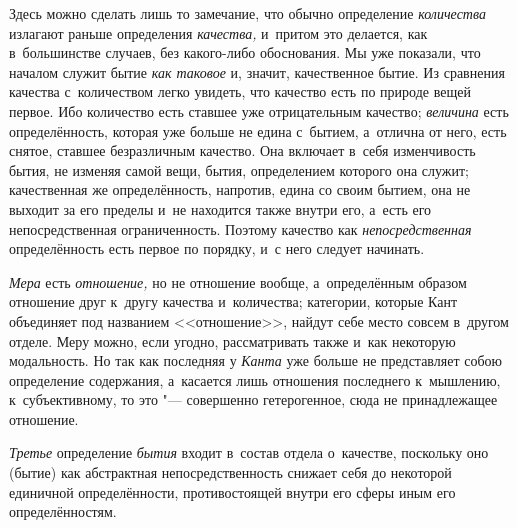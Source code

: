 Здесь можно сделать лишь то замечание, что обычно определение {\em количества}
излагают раньше определения {\em качества,} и~притом это делается, как
в~большинстве случаев, без какого-либо обоснования. Мы уже показали, что
началом служит бытие {\em как таковое} и, значит, качественное бытие. Из
сравнения качества с~количеством легко увидеть, что качество есть по природе
вещей первое. Ибо количество есть ставшее уже отрицательным качество;
{\em величина} есть определённость, которая уже больше не едина с~бытием,
а~отлична от него, есть снятое, ставшее безразличным качество. Она включает
в~себя изменчивость бытия, не изменяя самой вещи, бытия, определением которого
она служит; качественная же определённость, напротив, едина со своим бытием,
она не выходит за его пределы и~не находится также внутри его, а~есть его
непосредственная ограниченность. Поэтому качество как {\em непосредственная}
определённость есть первое по порядку, и~с него следует начинать.

{\em Мера} есть {\em отношение,} но не отношение вообще, а~определённым образом
отношение друг к~другу качества и~количества; категории, которые Кант
объединяет под названием <<отношение>>, найдут себе место совсем в~другом
отделе. Меру можно, если угодно, рассматривать также и~как некоторую
модальность. Но так как последняя у {\em Канта} уже больше не представляет
собою определение содержания, а~касается лишь отношения последнего к~мышлению,
к~субъективному, то это "--- совершенно гетерогенное, сюда не принадлежащее
отношение.

{\em Третье} определение {\em бытия} входит в~состав отдела о~качестве,
поскольку оно (бытие) как абстрактная непосредственность снижает себя до
некоторой единичной определённости, противостоящей внутри его сферы иным
его определённостям.

\bigskip

